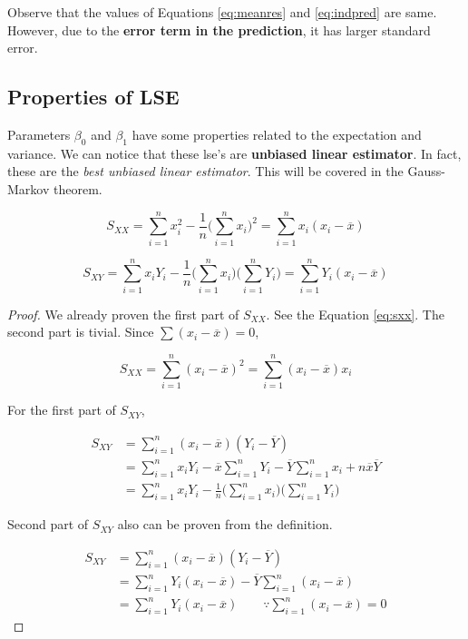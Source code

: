 \documentclass[]{book}
\theoremstyle{definition}
\theoremstyle{definition}
\theoremstyle{definition}
\theoremstyle{remark}
\let\BeginKnitrBlock\begin \let\EndKnitrBlock\end
\begin{document}
Observe that the values of Equations \eqref{eq:meanres} and \eqref{eq:indpred} are same. However, due to the \textbf{error term in the prediction}, it has larger standard error.

\hypertarget{lseprop}{%
\subsection{Properties of LSE}\label{lseprop}}

Parameters \(\beta_0\) and \(\beta_1\) have some properties related to the expectation and variance. We can notice that these lse's are \textbf{unbiased linear estimator}. In fact, these are the \emph{best unbiased linear estimator}. This will be covered in the Gauss-Markov theorem.

\BeginKnitrBlock{lemma}
\protect\hypertarget{lem:sxy}{}{\label{lem:sxy} }\[S_{XX} = \sum_{i = 1}^n x_i^2 - \frac{1}{n}\bigg(\sum\limits_{i = 1}^n x_i\bigg)^2 = \sum_{i = 1}^n x_i(x_i - \overline{x})\]

\[S_{XY} = \sum_{i = 1}^n x_i Y_i - \frac{1}{n}\bigg(\sum_{i = 1}^n x_i\bigg)\bigg(\sum_{i = 1}^n Y_i\bigg) = \sum_{i = 1}^n Y_i(x_i - \overline{x})\]
\EndKnitrBlock{lemma}

\BeginKnitrBlock{proof}
{}We already proven the first part of \(S_{XX}\). See the Equation \eqref{eq:sxx}. The second part is tivial. Since \(\sum (x_i - \overline{x}) = 0\),

\[S_{XX} = \sum_{i = 1}^n (x_i - \overline{x})^2 = \sum_{i = 1}^n (x_i - \overline{x})x_i\]

For the first part of \(S_{XY}\),

\begin{equation*}
  \begin{split}
    S_{XY} & = \sum_{i = 1}^n (x_i - \overline{x})(Y_i - \overline{Y}) \\
    & = \sum_{i = 1}^n x_i Y_i - \overline{x} \sum_{i = 1}^n Y_i - \overline{Y} \sum_{i = 1}^n x_i + n \overline{x} \overline{Y} \\
    & = \sum_{i = 1}^n x_i Y_i - \frac{1}{n}\bigg(\sum_{i = 1}^n x_i\bigg)\bigg(\sum_{i = 1}^n Y_i\bigg)
  \end{split}
\end{equation*}

Second part of \(S_{XY}\) also can be proven from the definition.

\begin{equation*}
  \begin{split}
    S_{XY} & = \sum_{i = 1}^n (x_i - \overline{x})(Y_i - \overline{Y}) \\
    & = \sum_{i = 1}^n Y_i (x_i - \overline{x}) - \overline{Y} \sum_{i = 1}^n (x_i - \overline{x}) \\
    & = \sum_{i = 1}^n Y_i (x_i - \overline{x}) \qquad \because \sum_{i = 1}^n (x_i - \overline{x}) = 0
  \end{split}
\end{equation*}
\EndKnitrBlock{proof}
\end{document}
